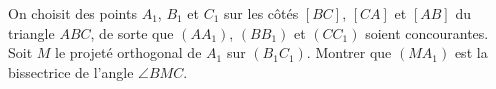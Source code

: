 On choisit des points $A_1$, $B_1$ et $C_1$ sur les côtés $[BC]$, $[CA]$ et $[AB]$ du triangle $ABC$, de sorte que $(AA_1)$, $(BB_1)$ et $(CC_1)$ soient concourantes. Soit $M$ le projeté orthogonal de $A_1$ sur $(B_1C_1)$. Montrer que $(MA_1)$ est la bissectrice de l'angle $\angle BMC$.
